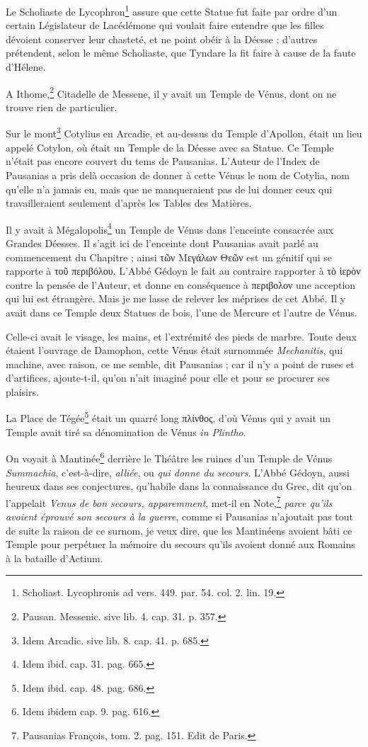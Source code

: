 \documentclass[a4paper, 18pt, oneside]{article}
\begin{document}
Le Scholiaste de Lycophron\footnote{Scholiast. Lycophronis ad vers. 449. par. 54. col. 2. lin. 19.} assure que cette Statue fut faite par ordre d'un certain Législateur de Lacédémone qui voulait faire entendre que les filles dévoient conserver leur chasteté, et ne point obéir à la Déesse : d'autres prétendent, selon le même Scholiaste, que Tyndare la fit faire à cause de la faute d'Hélene.

A Ithome,\footnote{Pausan. Messenic. sive lib. 4. cap. 31. p. 357.} Citadelle de Messene, il y avait un Temple de Vénus, dont on ne trouve rien de particulier.

Sur le mont\footnote{Idem Arcadic. sive lib. 8. cap. 41. p. 685.} Cotylius en Arcadie, et au-dessus du Temple d'Apollon, était un lieu appelé Cotylon, où était un Temple de la Déesse avec sa Statue. Ce Temple n'était pas encore couvert du tems de Pausanias. L'Auteur de l'Index de Pausanias a pris delà occasion de donner à cette Vénus le nom de Cotylia, nom qu'elle n'a jamais eu, mais que ne manqueraient pas de lui donner ceux qui travailleraient seulement d'après les Tables des Matières.

Il y avait à Mégalopolis\footnote{Idem ibid. cap. 31. pag. 665.} un Temple de Vénus dans l'enceinte consacrée aux Grandes Déesses. Il s'agit ici de l'enceinte dont Pausanias avait parlé au commencement du Chapitre ; ainsi τῶν Μεγάλων Θεῶν est un génitif qui se rapporte à τοῦ περιβόλου. L'Abbé Gédoyn le fait au contraire rapporter à τὸ ἱερὸν contre la pensée de l'Auteur, et donne en conséquence à περιβολον une acception qui lui est étrangère. Mais je me lasse de relever les méprises de cet Abbé. Il y avait dans ce Temple deux Statues de bois, l'une de Mercure et l'autre de Vénus.

Celle-ci avait le visage, les mains, et l'extrémité des pieds de marbre. Toute deux étaient l'ouvrage de Damophon, cette Vénus était surnommée \emph{Mechanitis}, qui machine, avec raison, ce me semble, dit Pausanias ; car il n'y a point de ruses et d'artifices, ajoute-t-il, qu'on n'ait imaginé pour elle et pour se procurer ses plaisirs.

La Place de Tégée\footnote{Idem ibid. cap. 48. pag. 686.} était un quarré long πλίνθος, d'où Vénus qui y avait un Temple avait tiré sa dénomination de Vénus \emph{in Plintho}.

On voyait à Mantinée\footnote{Idem ibidem cap. 9. pag. 616.} derrière le Théâtre les ruines d'un Temple de Vénus \emph{Summachia}, c'est-à-dire, \emph{alliée}, ou \emph{qui donne du secours}. L'Abbé Gédoyn, aussi heureux dans ses conjectures, qu'habile dans la connaissance du Grec, dit qu'on l'appelait \emph{Venus de bon secours, apparemment}, met-il en Note,\footnote{Pausanias François, tom. 2. pag. 151. Edit de Paris.} \emph{parce qu'ils avoient éprouvé son secours à la guerre}, comme si Pausanias n'ajoutait pas tout de suite la raison de ce surnom, je veux dire, que les Mantinéens avoient bâti ce Temple pour perpétuer la mémoire du secours qu'ils avoient donné aux Romains à la bataille d'Actium.
\end{document}
